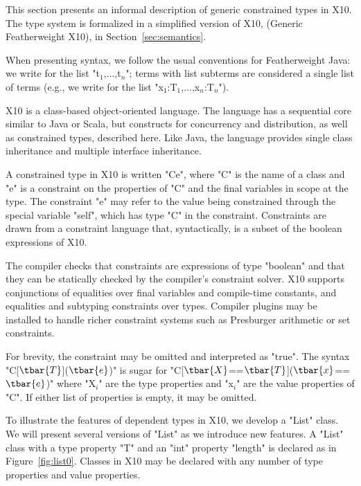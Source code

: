 
This section presents an informal description of 
generic constrained types in X10.  The type system is formalized
in a simplified version of X10, \gxx (Generic Featherweight X10), in
Section~\ref{sec:semantics}.

When presenting syntax, we follow the usual conventions for
Featherweight Java:
we write  for the list
\xcdmath"t$_1$,$\dots$,t$_n$"; 
terms with list subterms are considered 
a single list of terms (e.g., 
we write \Xcd{:} for the list
\xcdmath"x$_1$:T$_1$,$\dots$,x$_n$:T$_n$").

X10 is a class-based object-oriented language.
The language has a sequential core similar to Java or Scala, but 
constructs
for concurrency and distribution, as well as constrained types,
described here.
Like Java, the language provides single class inheritance and
multiple interface inheritance.

A constrained type in X10 is written \xcd"C{e}", where \xcd"C" is the
name of a class and \xcd"e" is a constraint on the properties of
\xcd"C" and the final variables in scope at the type.  The
constraint \xcd"e" may refer to the value being constrained
through the special variable \xcd"self", which has type \xcd"C"
in the constraint.  Constraints are drawn from a constraint
language that, syntactically, is a subset of the boolean
expressions of X10.

The compiler checks that constraints are expressions
of type \xcd"boolean" and that they can be statically checked by
the compiler's constraint solver.  
X10 supports conjunctions of equalities
over final variables and compile-time constants, and equalities
and subtyping constraints over types.
Compiler plugins may be installed to
handle richer constraint systems such as Presburger arithmetic
or set constraints.

For brevity, the constraint may be omitted and
interpreted as \xcd"true".
The syntax
\xcdmath"C[$\tbar{T}$]($\tbar{e}$)" is sugar for
\xcdmath"C[$\tbar{X}$==$\tbar{T}$]($\tbar{x}$==$\tbar{e}$)"
where \xcd"X$_i$" are the type properties and \xcd"x$_i$" are the
value properties of \xcd"C".
If either list of properties is empty, it may be omitted.

To illustrate the features of dependent types in X10, we develop a \xcd"List"
class.  We will present several versions of \xcd"List" as we
introduce new features.
A \xcd"List" class with a type property \xcd"T" and an \xcd"int"
property \xcd"length" is declared as in Figure~\ref{fig:list0}.
Classes in X10 may be declared with any number of type properties and
value properties.


